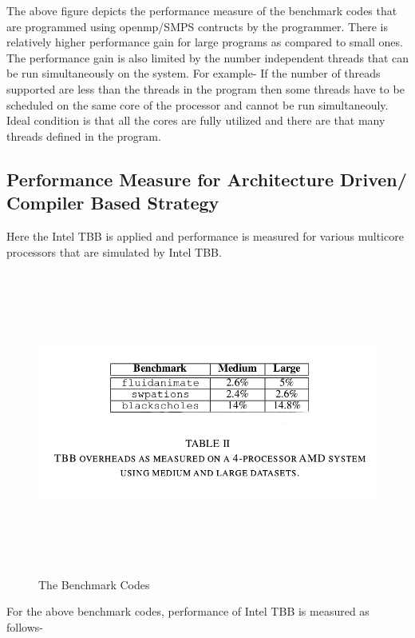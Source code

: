 \documentclass[a4paper,12pt]{article}
\begin{document}
The above figure depicts the performance measure of the benchmark codes that are programmed using openmp/SMPS contructs by the programmer. There is relatively higher performance gain for large programs as compared to small ones. The performance gain is also limited by the number independent threads that can be run simultaneously on the system. For example- If the number of threads supported are less than the threads in the program then some threads have to be scheduled on the same core of the processor and cannot be run simultaneouly. Ideal condition is that all the cores are fully utilized and there are that many threads defined in the program.\cite{benchmark}

\subsection{Performance Measure for Architecture Driven/ Compiler Based Strategy}
Here the Intel TBB is applied and performance is measured for various multicore processors that are simulated by Intel TBB.
\begin{figure}[H]
  \includegraphics[width=\textwidth,height=10cm]{table2.png}
  \caption{The Benchmark Codes}
  \label{fig:table2}
\end{figure}
For the above benchmark codes, performance of Intel TBB is measured as follows-
\end{document}
